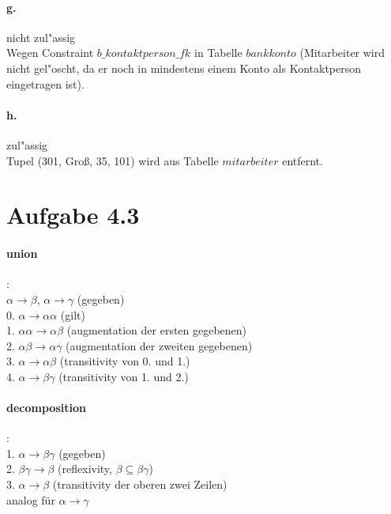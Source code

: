 \documentclass{article}
\begin{document}
		\paragraph*{g.}nicht zul"assig\\
		Wegen Constraint $ b\_kontaktperson\_fk $ in Tabelle $ bankkonto $ (Mitarbeiter wird nicht gel"oscht, da er noch in mindestens einem Konto als Kontaktperson eingetragen ist).
		
		\paragraph*{h.}zul"assig\\
		Tupel (301, Groß, 35, 101) wird aus Tabelle $ mitarbeiter $ entfernt.
		
		\pagebreak
		
		
	\section*{Aufgabe 4.3}
		\paragraph*{union}:\\
			$\alpha \rightarrow \beta$,	$\alpha \rightarrow \gamma$ \hspace*{25mm} (gegeben)\\
			0. $\alpha \rightarrow \alpha \alpha$ \hspace*{31mm} (gilt)\\
			1. $\alpha \alpha \rightarrow \alpha \beta$ \hspace*{29mm} (augmentation der ersten gegebenen)\\
			2. $\alpha \beta \rightarrow \alpha \gamma$ \hspace*{29mm} (augmentation der zweiten gegebenen)\\
			3. $\alpha \rightarrow \alpha \beta$ \hspace*{31mm} (transitivity von 0. und 1.)\\
			4. $\alpha \rightarrow \beta \gamma$ \hspace*{31mm} (transitivity von 1. und 2.)
			
		\paragraph*{decomposition}:\\
			1. $\alpha \rightarrow \beta \gamma$ \hspace*{31mm} (gegeben)\\
			2. $\beta \gamma \rightarrow \beta$ \hspace*{31mm} (reflexivity, $\beta \subseteq \beta\gamma$)\\
			3. $\alpha \rightarrow \beta$ \hspace*{33mm} (transitivity der oberen zwei Zeilen)\\
			analog für $\alpha \rightarrow \gamma$
		
\end{document}
